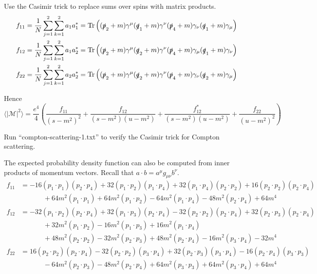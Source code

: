 \documentclass[12pt]{article}
\begin{document}
\noindent
Use the Casimir trick to replace sums over spins with matrix products.
\begin{align*}
f_{11}&=\frac{1}{N} \sum_{j=1}^2\sum_{k=1}^2 a_1a_1^*=\mathop{\rm Tr}
\left(
(\slashed{p}_2+m)\gamma^\mu(\slashed{q}_1+m)\gamma^\nu(\slashed{p}_4+m)\gamma_\nu(\slashed{q}_1+m)\gamma_\mu
\right)
\\
f_{12}&=\frac{1}{N} \sum_{j=1}^2\sum_{k=1}^2 a_1a_2^*=\mathop{\rm Tr}
\left(
(\slashed{p}_2+m)\gamma^\mu(\slashed{q}_2+m)\gamma^\nu(\slashed{p}_4+m)\gamma_\mu(\slashed{q}_1+m)\gamma_\nu
\right)
\\
f_{22}&=\frac{1}{N} \sum_{j=1}^2\sum_{k=1}^2 a_2a_2^*=\mathop{\rm Tr}
\left(
(\slashed{p}_2+m)\gamma^\mu(\slashed{q}_2+m)\gamma^\nu(\slashed{p}_4+m)\gamma_\nu(\slashed{q}_2+m)\gamma_\mu
\right)
\end{align*}

\noindent
Hence
\begin{equation}
\langle|\mathcal{M}|^2\rangle
=
\frac{e^4}{4}
\left(
\frac{f_{11}}{(s-m^2)^2}
+\frac{f_{12}}{(s-m^2)(u-m^2)}
+\frac{f_{12}^*}{(s-m^2)(u-m^2)}
+\frac{f_{22}}{(u-m^2)^2}
\right)
\end{equation}

\noindent
Run ``compton-scattering-1.txt'' to verify the Casimir trick for Compton scattering.

\bigskip
\noindent
The expected probability density function can also be computed from inner products of momentum vectors.
Recall that $a\cdot b=a^\mu g_{\mu\nu}b^\nu$.
\begin{align*}
f_{11}&=
-16 (p_1 \cdot p_1) (p_2 \cdot p_4) +
 32 (p_1 \cdot p_2) (p_1 \cdot p_4) +
 32 (p_1 \cdot p_4) (p_2 \cdot p_2) +
 16 (p_2 \cdot p_2) (p_2 \cdot p_4) %
\\ &\phantom{=}\qquad{}+
 64 m^2 (p_1 \cdot p_1) +
 64 m^2 (p_1 \cdot p_2) -
 64 m^2 (p_1 \cdot p_4) -
 48 m^2 (p_2 \cdot p_4) + 64 m^4
\\
f_{12}&=
-32 (p_1 \cdot p_2) (p_2 \cdot p_4) +
 32 (p_1 \cdot p_3) (p_2 \cdot p_4) -
 32 (p_2 \cdot p_2) (p_2 \cdot p_4) +
 32 (p_2 \cdot p_3) (p_2 \cdot p_4) %
 \\ &\phantom{=}\qquad{}+
 32 m^2 (p_1 \cdot p_2) -
 16 m^2 (p_1 \cdot p_3) +
 16 m^2 (p_1 \cdot p_4) %
 \\ &\phantom{=}\qquad{}+
 48 m^2 (p_2 \cdot p_2) -
 32 m^2 (p_2 \cdot p_3) +
 48 m^2 (p_2 \cdot p_4) -
 16 m^2 (p_3 \cdot p_4) - 32 m^4
\\
f_{22}&=
16 (p_2 \cdot p_2) (p_2 \cdot p_4) -
32 (p_2 \cdot p_2) (p_3 \cdot p_4) +
32 (p_2 \cdot p_3) (p_3 \cdot p_4) -
16 (p_2 \cdot p_4) (p_3 \cdot p_3) %
\\ &\phantom{=}\qquad{}-
64 m^2 (p_2 \cdot p_3) -
48 m^2 (p_2 \cdot p_4) +
64 m^2 (p_3 \cdot p_3) +
64 m^2 (p_3 \cdot p_4) + 64 m^4
\end{align*}
\end{document}
